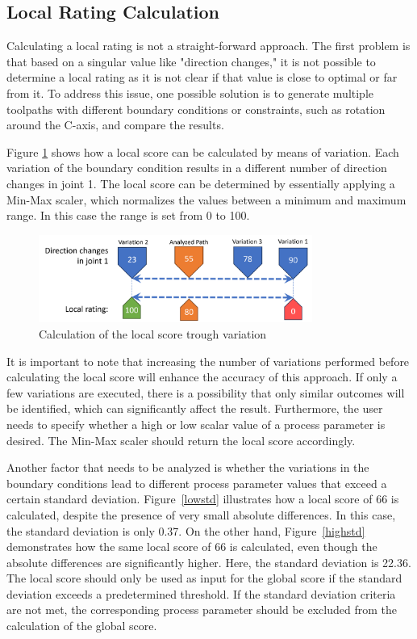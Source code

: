 \subsection{Local Rating Calculation}\label{LRC}
Calculating a local rating is not a straight-forward approach. The first problem is that based on a singular value like "direction changes," it is not possible to determine a local rating as it is not clear if that value is close to optimal or far from it.
To address this issue, one possible solution is to generate multiple toolpaths with different boundary conditions or constraints, such as rotation around the C-axis, and compare the results.

Figure \ref{Localscore} shows how a local score can be calculated by means of variation. Each variation  of the boundary condition results in a different number of direction changes in joint 1. The local score can be determined by essentially applying a Min-Max scaler, which normalizes the values between a minimum and maximum range. In this case the range is set from 0 to 100.

\begin{figure}[H]
	\centerline{\includegraphics[width=0.8\textwidth]{figures/localscore.png}}
	\caption{Calculation of the local score trough variation}
	\label{Localscore}
\end{figure}

It is important to note that increasing the number of variations performed before calculating the local score will enhance the accuracy of this approach. If only a few variations are executed, there is a possibility that only similar outcomes will be identified, which can significantly affect the result. Furthermore, the user needs to specify whether a high or low scalar value of a process parameter is desired. The Min-Max scaler should return the local score accordingly. 

Another factor that needs to be analyzed is whether the variations in the boundary conditions lead to different process parameter values that exceed a certain standard deviation. Figure~\ref{lowstd} illustrates how a local score of 66 is calculated, despite the presence of very small absolute differences. In this case, the standard deviation is only 0.37. On the other hand, Figure~\ref{highstd} demonstrates how the same local score of 66 is calculated, even though the absolute differences are significantly higher. Here, the standard deviation is 22.36. The local score should only be used as input for the global score if the standard deviation exceeds a predetermined threshold. If the standard deviation criteria are not met, the corresponding process parameter should be excluded from the calculation of the global score.

